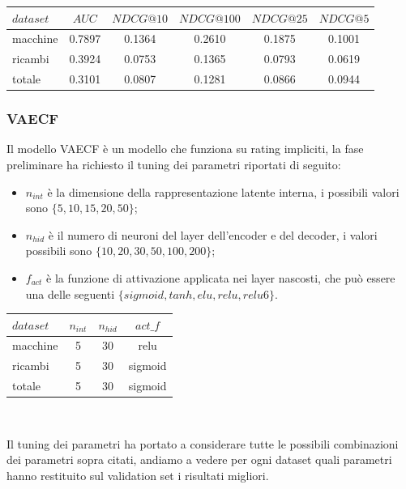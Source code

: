 \begin{tabular}{|l|c|cccc|}
    \toprule
    $dataset$ &    $AUC$ &  $NDCG@10$ & $NDCG@100$  & $NDCG@25$ & $NDCG@5$  \\
    \midrule
    macchine & 0.7897 &  0.1364 &   0.2610 &  0.1875 & 0.1001 \\
    ricambi  & 0.3924 &  0.0753 &   0.1365 &  0.0793 & 0.0619 \\
    totale  & 0.3101 &  0.0807 &   0.1281 &  0.0866 & 0.0944 \\

\bottomrule
\end{tabular}

\subsubsection{VAECF}
Il modello VAECF è un modello che funziona su rating impliciti, la fase preliminare ha richiesto il tuning dei parametri riportati di seguito:
\begin{itemize}
    \item $n_{int}$ è la dimensione della rappresentazione latente interna, i possibili valori sono $\{5,10,15,20,50\}$;
    \item $n_{hid}$ è il numero di neuroni del layer dell'encoder e del decoder, i valori possibili sono $\{10,20,30,50,100,200\}$;
    \item $f_{act}$ è la funzione di attivazione applicata nei layer nascosti, che può essere una delle seguenti $\{sigmoid, tanh, elu, relu, relu6\}$.
\end{itemize}
\begin{minipage}[H]{0.45\textwidth}
    \begin{tabular}{|l|ccc|}
        \toprule
        $dataset$ &    $n_{int}$ &  $n_{hid}$ & $act\_f$ \\
        \midrule
        macchine & 5 & 30 & relu \\
        ricambi  &	5 & 30 & sigmoid\\
        totale  & 5 & 30 & sigmoid\\
    \bottomrule
    \end{tabular}\\
\end{minipage}
\begin{minipage}[H]{0.55\textwidth}
    Il tuning dei parametri ha portato a considerare tutte le possibili combinazioni dei parametri sopra citati, andiamo a vedere per ogni dataset quali parametri hanno restituito sul validation set i risultati migliori.
\end{minipage}\\

